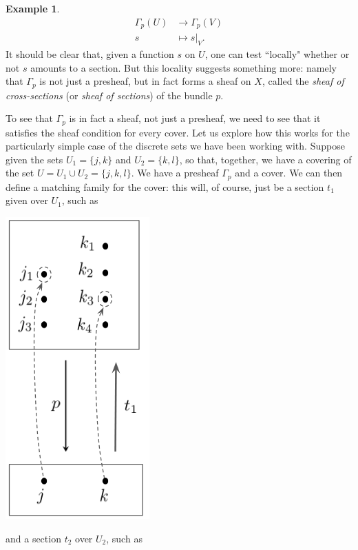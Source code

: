 \documentclass[11pt]{book}
\theoremstyle{definition}
\newtheorem{example}{Example}[section]
\theoremstyle{definition}
\theoremstyle{definition}
\theoremstyle{theorem}
\theoremstyle{definition}
\begin{document}
\begin{example}
	\begin{align*}
	\Gamma_p(U) & \rightarrow \Gamma_p(V) \\
	s & \mapsto s|_V .  
	\end{align*}
	It should be clear that, given a function $s$ on $U$, one can test ``locally" whether or not $s$ amounts to a section. But this locality suggests something more: namely that $\Gamma_p$ is not just a presheaf, but in fact forms a sheaf on $X$, called the \textit{sheaf of cross-sections} (or \textit{sheaf of sections}) of the bundle $p$. \par 
	To see that $\Gamma_p$ is in fact a sheaf, not just a presheaf, we need to see that it satisfies the sheaf condition for every cover. Let us explore how this works for the particularly simple case of the discrete sets we have been working with. Suppose given the sets $U_1 = \{j,k\}$ and $U_2 = \{k,l\}$, so that, together, we have a covering of the set $U = U_1 \cup U_2 = \{j,k,l\}$. We have a presheaf $\Gamma_p$ and a cover. We can then define a matching family for the cover: this will, of course, just be a section $t_1$ given over $U_1$, such as 
	\begin{center}
		\includegraphics*[scale=0.3]{ShortSec1.png}
	\end{center}
	and a section $t_2$ over $U_2$, such as 
	\begin{center}

\end{center}
\end{example}
\end{document}
